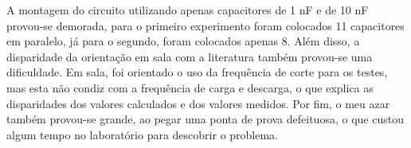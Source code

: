 \documentclass[a4paper,oneside,10pt]{article}
\begin{document}
A montagem do circuito utilizando apenas capacitores de 1 nF e de 10 nF provou-se demorada, para o primeiro experimento foram colocados 11 capacitores em paralelo, já para o segundo, foram colocados apenas 8. Além disso, a disparidade da orientação em sala com a literatura também provou-se uma dificuldade. Em sala, foi orientado o uso da frequência de corte para os testes, mas esta não condiz com a frequência de carga e descarga, o que explica as disparidades dos valores calculados e dos valores medidos. Por fim, o meu azar também provou-se grande, ao pegar uma ponta de prova defeituosa, o que custou algum tempo no laboratório para descobrir o problema.


\end{document}
